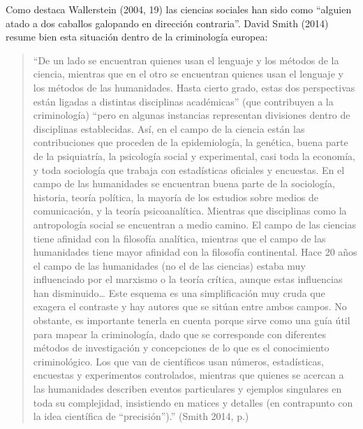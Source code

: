\documentclass[
  spanish,
  letterpaper,
  DIV=11,
  numbers=noendperiod]{scrreprt}
\begin{document}
Como destaca Wallerstein (2004, 19) las ciencias sociales han sido como
``alguien atado a dos caballos galopando en dirección contraria''. David
Smith (2014) resume bien esta situación dentro de la criminología
europea:

\begin{quote}
``De un lado se encuentran quienes usan el lenguaje y los métodos de la
ciencia, mientras que en el otro se encuentran quienes usan el lenguaje
y los métodos de las humanidades. Hasta cierto grado, estas dos
perspectivas están ligadas a distintas disciplinas académicas'' (que
contribuyen a la criminología) ``pero en algunas instancias representan
divisiones dentro de disciplinas establecidas. Así, en el campo de la
ciencia están las contribuciones que proceden de la epidemiología, la
genética, buena parte de la psiquiatría, la psicología social y
experimental, casi toda la economía, y toda sociología que trabaja con
estadísticas oficiales y encuestas. En el campo de las humanidades se
encuentran buena parte de la sociología, historia, teoría política, la
mayoría de los estudios sobre medios de comunicación, y la teoría
psicoanalítica. Mientras que disciplinas como la antropología social se
encuentran a medio camino. El campo de las ciencias tiene afinidad con
la filosofía analítica, mientras que el campo de las humanidades tiene
mayor afinidad con la filosofía continental. Hace 20 años el campo de
las humanidades (no el de las ciencias) estaba muy influenciado por el
marxismo o la teoría crítica, aunque estas influencias han
disminuido\ldots{} Este esquema es una simplificación muy cruda que
exagera el contraste y hay autores que se sitúan entre ambos campos. No
obstante, es importante tenerla en cuenta porque sirve como una guía
útil para mapear la criminología, dado que se corresponde con diferentes
métodos de investigación y concepciones de lo que es el conocimiento
criminológico. Los que van de científicos usan números, estadísticas,
encuestas y experimentos controlados, mientras que quienes se acercan a
las humanidades describen eventos particulares y ejemplos singulares en
toda su complejidad, insistiendo en matices y detalles (en contrapunto
con la idea científica de ``precisión'').'' (Smith 2014, p.)
\end{quote}
\end{document}
